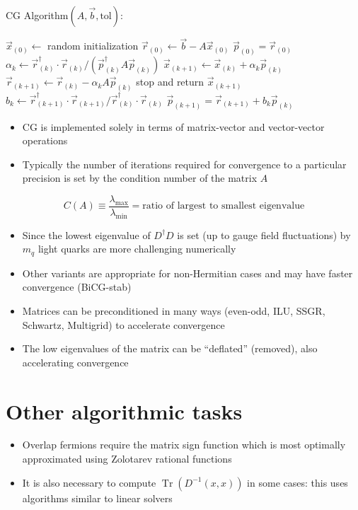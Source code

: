 CG Algorithm$(A, \vec{b}, \text{tol})$:
\begin{algorithmic}
    \State $\vec{x}_{(0)} \gets$ random initialization
    \State $\vec{r}_{(0)} \gets \vec{b} - A \vec{x}_{(0)}$
    \State $\vec{p}_{(0)} = \vec{r}_{(0)}$
    \State $\alpha_k \gets \vec{r}_{(k)}^\dagger \cdot \vec{r}_{(k)} / (\vec{p}_{(k)}^\dagger A \vec{p}_{(k)})$
    \State $\vec{x}_{(k+1)} \gets \vec{x}_{(k)} + \alpha_k \vec{p}_{(k)}$
    \State $\vec{r}_{(k+1)} \gets \vec{r}_{(k)} - \alpha_k A \vec{p}_{(k)}$
    \State stop and return $\vec{x}_{(k+1)}$
    \EndIf
    \State $b_k \gets \vec{r}_{(k+1)}^\dagger \cdot \vec{r}_{(k+1)}/\vec{r}_{(k)}^\dagger \cdot \vec{r}_{(k)}$
    \State $\vec{p}_{(k+1)} = \vec{r}_{(k+1)} + b_k \vec{p}_{(k)}$
    \EndFor
\end{algorithmic}
\begin{itemize}
    \item CG is implemented solely in terms of matrix-vector and vector-vector operations
    \item Typically the number of iterations required for convergence to a particular precision is set by the condition number of the matrix $A$
\end{itemize}
\begin{equation}
    C(A) \equiv \frac{\lambda_\text{max}}{\lambda_\text{min}} = \text{ratio of largest to smallest eigenvalue}
\end{equation}
\begin{itemize}
    \item Since the lowest eigenvalue of $D^\dagger D$ is set (up to gauge field fluctuations) by $m_q$ light quarks are more challenging numerically
    \item Other variants are appropriate for non-Hermitian cases and may have faster convergence (BiCG-stab)
    \item Matrices can be preconditioned in many ways (even-odd, ILU, SSGR, Schwartz, Multigrid) to accelerate convergence
    \item The low eigenvalues of the matrix can be ``deflated'' (removed), also accelerating convergence
\end{itemize}

\section{Other algorithmic tasks}
\begin{itemize}
    \item Overlap fermions require the matrix sign function which is most optimally approximated using Zolotarev rational functions
    \item It is also necessary to compute $\operatorname{Tr}(D^{-1}(x,x))$ in some cases: this uses algorithms similar to linear solvers
\end{itemize}

